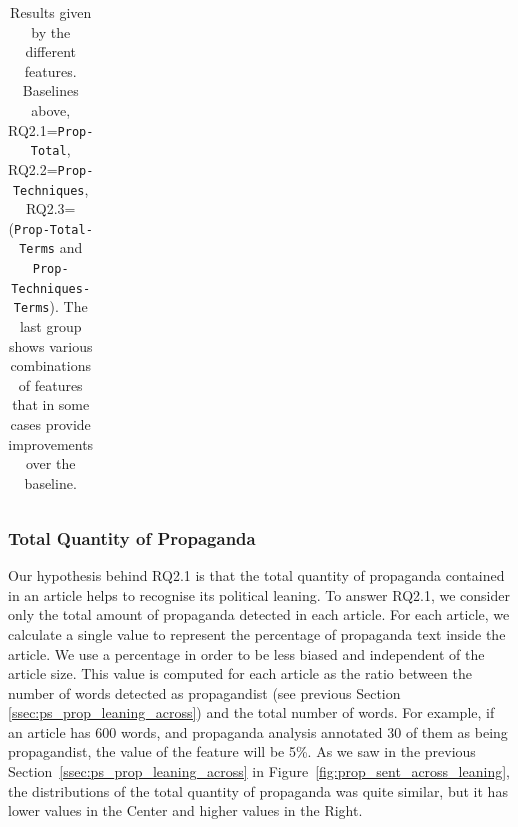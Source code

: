 \begin{table}[!htbp]
\begin{tabular}{l|rr|rr}
    \end{tabular}
    \caption{Results given by the different features. Baselines above, RQ2.1=\texttt{Prop-Total}, RQ2.2=\texttt{Prop-Techniques}, RQ2.3= (\texttt{Prop-Total-Terms} and \texttt{Prop-Techniques-Terms}). The last group shows various combinations of features that in some cases provide improvements over the baseline.}
    \label{tab:results_prop_features_classifier}
\end{table}


\subsubsection{Total Quantity of Propaganda}


Our hypothesis behind RQ2.1 is that the total quantity of propaganda contained in an article helps to recognise its political leaning. 
To answer RQ2.1, we consider only the total amount of propaganda detected in each article. For each article, we calculate a single value to represent the percentage of propaganda text inside the article. %
We use a percentage in order to be less biased and independent of the article size.
This value is computed for each article as the ratio between the number of words detected as propagandist (see previous Section \ref{ssec:ps_prop_leaning_across}) and the total number of words. For example, if an article has 600 words, and propaganda analysis annotated 30 of them as being propagandist, the value of the feature will be 5\%.  
As we saw in the previous Section~\ref{ssec:ps_prop_leaning_across} in Figure~\ref{fig:prop_sent_across_leaning}, the distributions of the total quantity of propaganda was quite similar, but it has lower values in the Center and higher values in the Right.

